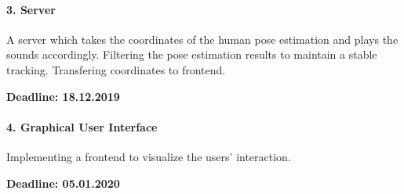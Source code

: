 \documentclass[titlepage, a4paper, 11pt]{scrartcl}
\begin{document}
\paragraph{3. Server}

A server which takes the coordinates of the human pose estimation and plays the sounds accordingly.
Filtering the pose estimation results to maintain a stable tracking. Transfering coordinates to frontend.
\begin{flushright}
    \textbf{Deadline: 18.12.2019}
\end{flushright}

\paragraph{4. Graphical User Interface}

Implementing a frontend to visualize the users' interaction.

\begin{flushright}
    \textbf{Deadline: 05.01.2020}
\end{flushright}
\end{document}

